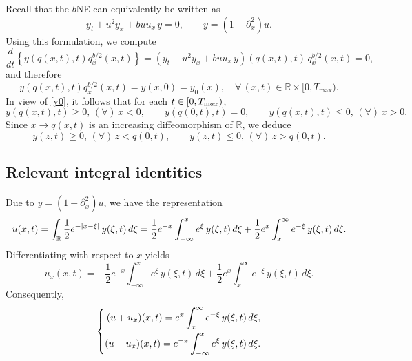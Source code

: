 \documentclass{amsart}
\newcommand{\R}{\mathbb R}
\begin{document}
Recall that the $b$NE can equivalently be written as
\begin{equation}
y_t+u^2y_x+buu_x\,y=0, \qquad y=(1-\partial^2_x)u.\label{bne}
\end{equation}
Using this formulation, we compute
\begin{equation*}
\frac{d}{dt}\left\{y(q(x,t),t)q_x^{b/2}(x,t)\right\}=(y_t+u^2y_x+buu_x\,y)(q(x,t),t)\,q_x^{b/2}(x,t)=0,
\end{equation*}
and therefore
\begin{equation*}
y(q(x,t),t)q_x^{b/2}(x,t)=y(x,0)=y_0(x), \quad \forall\, (x,t)\in \R\times [0,T_{\text{max}}).
\end{equation*}
In view of \eqref{y0}, it follows that for each $t\in [0,T_{\text max})$, 
\begin{equation*}
y(q(x,t),t)\geq 0,\,(\forall)\,x< 0,\qquad y(q(0,t),t)= 0,\qquad y(q(x,t),t)\leq 0,\,(\forall)\,x> 0. 
\end{equation*}
Since $x\to q(x,t)$ is an increasing diffeomorphism of $\R$, we deduce
\begin{equation}
y(z,t)\geq 0,\,(\forall)\,z< q(0,t), \qquad y(z,t)\leq 0,\,(\forall)\,z> q(0,t). \label{yq0}
\end{equation}



\subsection*{Relevant integral identities}
Due to $y=(1-\partial^2_x)u$, we have the representation
\begin{equation*}
\aligned
u(x,t)=\int_\R \frac{1}{2} e^{-|x-\xi|}\,  y(\xi,t)\, d\xi=
\frac{1}{2} e^{-x} 
\int_{-\infty}^x  e^{ \xi}\, y(\xi,t) \,d\xi 
+
\frac{1}{2}
e^{x}
\int_x^\infty  e^{-\xi } \,y(\xi,t)\, d\xi.  
\endaligned
\end{equation*}
Differentiating with respect to $x$ yields
\begin{equation*}
u_x(x,t) = 
- \frac{1}{2} e^{-x} \int_{-\infty}^x e^\xi\, y(\xi,t)\, d\xi
+
\frac{1}{2} e^x 
\int_{x}^\infty  e^{ - \xi} \,y(\xi,t)\, d\xi. 
\end{equation*}
Consequently,
\begin{equation}\left\{\aligned
(u+u_x)(x,t) = e^{x} \int_x^{\infty} e^{-\xi}\, y(\xi,t)\, d\xi,\\
(u-u_x)(x,t) = e^{-x} \int_{-\infty}^x e^\xi\, y(\xi,t)\, d\xi.
\endaligned
\right.
\label{uux}
\end{equation}
\end{document}
